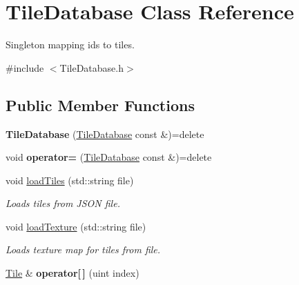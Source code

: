 \hypertarget{classTileDatabase}{\section{Tile\-Database Class Reference}
\label{classTileDatabase}
}


Singleton mapping ids to tiles.  




{\ttfamily \#include $<$Tile\-Database.\-h$>$}

\subsection*{Public Member Functions}
\begin{DoxyCompactItemize}
\item 
\hypertarget{classTileDatabase_a416e304c465d358759c5f75c2d9dd339}{{\bfseries Tile\-Database} (\hyperlink{classTileDatabase}{Tile\-Database} const \&)=delete}\label{classTileDatabase_a416e304c465d358759c5f75c2d9dd339}

\item 
\hypertarget{classTileDatabase_a6fea9bd536a262734b09a39e5b737250}{void {\bfseries operator=} (\hyperlink{classTileDatabase}{Tile\-Database} const \&)=delete}\label{classTileDatabase_a6fea9bd536a262734b09a39e5b737250}

\item 
void \hyperlink{classTileDatabase_a986e55f0705dbfb5428931563eff1497}{load\-Tiles} (std\-::string file)
\begin{DoxyCompactList}\small\item\em Loads tiles from J\-S\-O\-N file. \end{DoxyCompactList}\item 
\hypertarget{classTileDatabase_a1eb9f7c3ff7e497bada7a1475fb271f4}{void \hyperlink{classTileDatabase_a1eb9f7c3ff7e497bada7a1475fb271f4}{load\-Texture} (std\-::string file)}\label{classTileDatabase_a1eb9f7c3ff7e497bada7a1475fb271f4}

\begin{DoxyCompactList}\small\item\em Loads texture map for tiles from file. \end{DoxyCompactList}\item 
\hypertarget{classTileDatabase_ad523aefe10b495521a8ce71bd7015821}{\hyperlink{classTile}{Tile} \& {\bfseries operator\mbox{[}$\,$\mbox{]}} (uint index)}\label{classTileDatabase_ad523aefe10b495521a8ce71bd7015821}


\end{DoxyCompactItemize}
